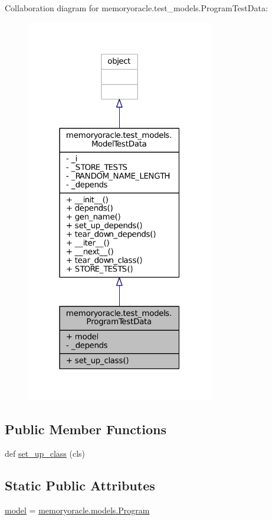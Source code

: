 Collaboration diagram for memoryoracle.\+test\+\_\+models.\+Program\+Test\+Data\+:\nopagebreak
\begin{figure}[H]
\begin{center}
\leavevmode
\includegraphics[width=232pt]{classmemoryoracle_1_1test__models_1_1ProgramTestData__coll__graph}
\end{center}
\end{figure}
\subsection*{Public Member Functions}
\begin{DoxyCompactItemize}
\item 
def \hyperlink{classmemoryoracle_1_1test__models_1_1ProgramTestData_a341a2e2ab6c252fd01a332f26ad2b184}{set\+\_\+up\+\_\+class} (cls)
\end{DoxyCompactItemize}
\subsection*{Static Public Attributes}
\begin{DoxyCompactItemize}
\item 
\hyperlink{classmemoryoracle_1_1test__models_1_1ProgramTestData_a89de08eb5e2a4a2662a7d8d2fc5d7ec4}{model} = \hyperlink{classmemoryoracle_1_1models_1_1Program}{memoryoracle.\+models.\+Program}
\end{DoxyCompactItemize}
